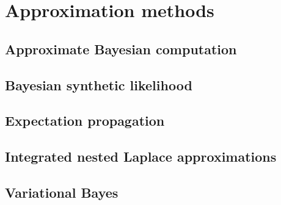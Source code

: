 \chapter{Approximation methods}\label{chap15}

\section{Approximate Bayesian computation}\label{sec15_1}

\section{Bayesian synthetic likelihood}\label{sec15_2}

\section{Expectation propagation}\label{sec15_3}

\section{Integrated nested Laplace approximations}\label{sec15_4}

\section{Variational Bayes}\label{sec15_5}



